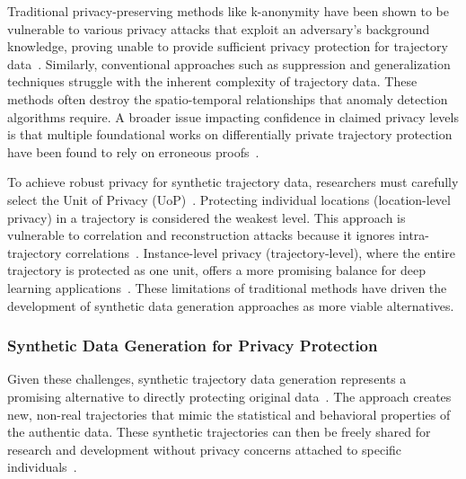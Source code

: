 \documentclass[runningheads]{llncs}
\begin{document}
Traditional privacy-preserving methods like k-anonymity have been shown to be vulnerable to various privacy attacks that exploit an adversary's background knowledge, proving unable to provide sufficient privacy protection for trajectory data~\cite{chenDifferentiallyPrivateTrajectory2011,buchholzReconstructionAttackDifferential2022,jinSurveyExperimentalStudy2023}. Similarly, conventional approaches such as suppression and generalization techniques struggle with the inherent complexity of trajectory data. These methods often destroy the spatio-temporal relationships that anomaly detection algorithms require. A broader issue impacting confidence in claimed privacy levels is that multiple foundational works on differentially private trajectory protection have been found to rely on erroneous proofs~\cite{buchholzSystematisationKnowledgeTrajectory2024,primaultDifferentiallyPrivateLocation2014,erroundaAnalysisDifferentialPrivacy2019}.

To achieve robust privacy for synthetic trajectory data, researchers must carefully select the Unit of Privacy (UoP)~\cite{buchholzSystematisationKnowledgeTrajectory2024,primaultLongRoadComputational2019}. Protecting individual locations (location-level privacy) in a trajectory is considered the weakest level. This approach is vulnerable to correlation and reconstruction attacks because it ignores intra-trajectory correlations~\cite{buchholzSystematisationKnowledgeTrajectory2024,buchholzReconstructionAttackDifferential2022,primaultDifferentiallyPrivateLocation2014,erroundaAnalysisDifferentialPrivacy2019}. Instance-level privacy (trajectory-level), where the entire trajectory is protected as one unit, offers a more promising balance for deep learning applications~\cite{buchholzSystematisationKnowledgeTrajectory2024}. These limitations of traditional methods have driven the development of synthetic data generation approaches as more viable alternatives.

\subsubsection{Synthetic Data Generation for Privacy Protection}

Given these challenges, synthetic trajectory data generation represents a promising alternative to directly protecting original data~\cite{buchholzSystematisationKnowledgeTrajectory2024,raoLSTMTrajGANDeepLearning2020a,liuTrajGANsUsingGenerative2018}. The approach creates new, non-real trajectories that mimic the statistical and behavioral properties of the authentic data. These synthetic trajectories can then be freely shared for research and development without privacy concerns attached to specific individuals~\cite{raoLSTMTrajGANDeepLearning2020a,liuTrajGANsUsingGenerative2018,quGenerativeAdversarialNetworks2020}.
\end{document}
